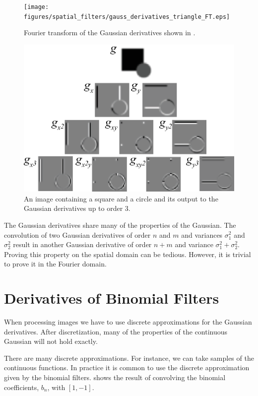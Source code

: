 \begin{figure}[t]
	\centerline{
		\texttt{[image: figures/spatial\_filters/gauss\_derivatives\_triangle\_FT.eps]}}
	\caption{Fourier transform of the Gaussian derivatives shown in \fig{\ref{fig:gauss_derivatives_triangle}}.}
	\label{fig:gauss_derivatives_triangle_FT}
\end{figure}


\begin{figure}[t]
	\centerline{
		\includegraphics[width=0.8\linewidth]{figures/derivatives/fig_gauss_derivatives_triangle_mondrian.eps}}
	\caption{An image containing a square and a circle and its output to the Gaussian derivatives up to order 3.}
	\label{fig:gauss_derivatives_mondrian}
\end{figure}


The Gaussian derivatives share many of the properties of the Gaussian. The convolution of two Gaussian derivatives of order $n$ and $m$ and variances $\sigma_1^2$ and $\sigma_2^2$ result in another Gaussian derivative of order $n+m$ and variance $\sigma_1^2 + \sigma_2^2$. Proving this property on the spatial domain can be tedious. However, it is trivial to prove it in the Fourier domain.







\section{Derivatives of Binomial Filters}
\label{sec:derivatives_binomial_filters}
When processing images we have to use discrete approximations for the Gaussian derivatives. After discretization, many of the properties of the continuous Gaussian will not hold exactly.

There are many discrete approximations. For instance, we can take samples of the continuous functions. In practice it is common to use the discrete approximation given by the binomial filters. \Fig{\ref{fig:derivativepascaltriangle}} shows the result of convolving the binomial coefficients, $b_n$, with  $\left[1, -1\right]$.

